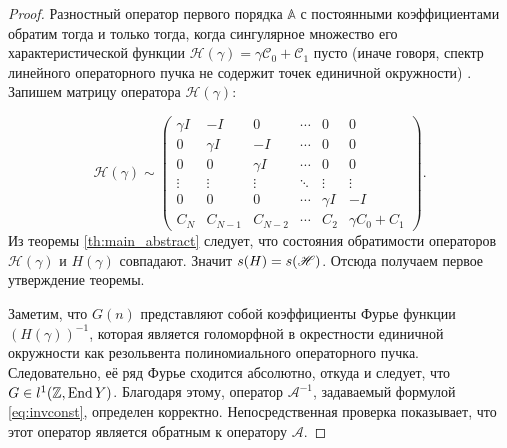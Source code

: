\begin{proof}
    Разностный оператор первого порядка $\mathbb A$ с постоянными коэффициентами обратим тогда и только тогда, когда сингулярное множество его характеристической функции $\mathcal H(\gamma) = \gamma \mathcal C_0 + \mathcal C_1$ пусто (иначе говоря, спектр линейного операторного пучка не содержит точек единичной окружности) \cite[теорема 3]{Bas01}.
    Запишем матрицу оператора $\mathcal H(\gamma)$:

    \[ \mathcal H(\gamma) \sim \begin{pmatrix}
    \gamma I & -I & 0  & \cdots & 0 & 0 \\
    0 & \gamma I  & -I & \cdots & 0 & 0 \\
    0 & 0  & \gamma I & \cdots & 0 & 0 \\
    \vdots & \vdots & \vdots & \ddots & \vdots & \vdots \\
    0 & 0 & 0 & \cdots & \gamma I & -I \\
    C_N & C_{N-1} & C_{N-2} & \cdots & C_2 & \gamma C_0 + C_1
   \end{pmatrix}.\]
   Из теоремы \ref{th:main_abstract} следует, что состояния обратимости операторов $\mathcal H(\gamma)$ и $H(\gamma)$ совпадают. Значит $s(H) \hm= s(\mathcal H)$. Отсюда получаем первое утверждение теоремы.

   Заметим, что $G(n)$ представляют собой коэффициенты Фурье функции $(H(\gamma))^{-1}$, которая является голоморфной в окрестности единичной окружности как резольвента полиномиального операторного пучка. Следовательно, её ряд Фурье сходится абсолютно, откуда и следует, что $G \hm\in l^1(\groupz, \End Y)$. Благодаря этому, оператор $\mathcal A^{-1}$, задаваемый формулой \eqref{eq:invconst}, определен корректно. Непосредственная проверка показывает, что этот оператор является обратным к оператору $\mathcal A$.
\end{proof}

